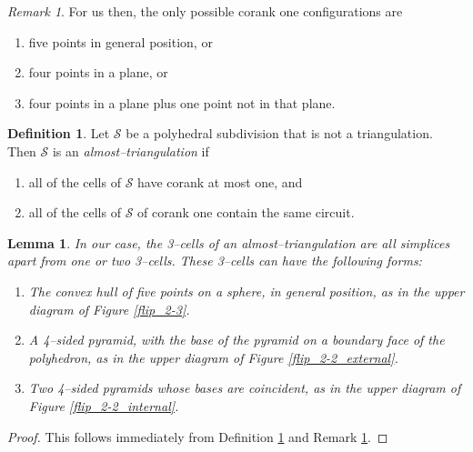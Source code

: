 \documentclass[12pt]{amsart}
\newtheorem{lemma}[thm]{Lemma}
\theoremstyle{definition}
\newtheorem{defn}[thm]{Definition}
\theoremstyle{remark}
\newtheorem{rmk}[thm]{Remark}
\begin{document}
\begin{rmk}\label{our corank one configs}
For us then, the only possible corank one configurations are 
\begin{enumerate}
\item five points in general position, or \label{corank 1 5}
\item four points in a plane, or  \label{corank 1 4}
\item four points in a plane plus one point not in that plane. \label{corank 1 4+1}
\end{enumerate}
\end{rmk}

\begin{defn}\label{def:almost-triangulation}
Let $\mathcal{S}$ be a polyhedral subdivision that is not a triangulation. Then $\mathcal{S}$ is an \emph{almost--triangulation} if
\begin{enumerate}
\item all of the cells of $\mathcal{S}$ have corank at most one, and
\item all of the cells of $\mathcal{S}$ of corank one contain the same circuit.
\end{enumerate}
\end{defn}

\begin{lemma}\label{lem:almost-triangulations}
In our case, the 3--cells of an almost--triangulation are all simplices apart from one or two 3--cells. These 3--cells can have the following forms:
\begin{enumerate}
\item The convex hull of five points on a sphere, in general position,  as in the upper diagram of Figure \ref{flip_2-3}. \label{a-t_flip_2-3}
\item A 4--sided pyramid, with the base of the pyramid on a boundary face of the polyhedron, as in the upper diagram of Figure \ref{flip_2-2_external}. \label{a-t_flip_2-2_external}
\item Two 4--sided pyramids whose bases are coincident, as in the upper diagram of  Figure \ref{flip_2-2_internal}. \label{a-t_flip_2-2_internal}  
\end{enumerate}
\end{lemma}
\begin{proof}
This follows immediately from Definition \ref{def:almost-triangulation} and Remark \ref{our corank one configs}. 
\end{proof}
\end{document}
